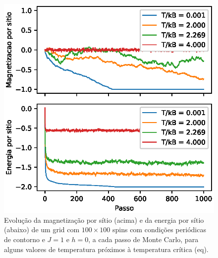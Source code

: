 \begin{figure}[ht]
	\centering
	\includegraphics[scale = 1]{./img/evolucao-mc-temperaturas}
    \caption{Evolução da magnetização por sítio (acima) e da energia por sítio (abaixo) de um grid com $100 \times 100$ spins com condições periódicas de contorno e $J = 1$ e $h = 0$, a cada passo de Monte Carlo, para alguns valores de temperatura próximos à temperatura crítica (eq).}
    \label{fig:evolucao-mc-temperaturas}
\end{figure}

